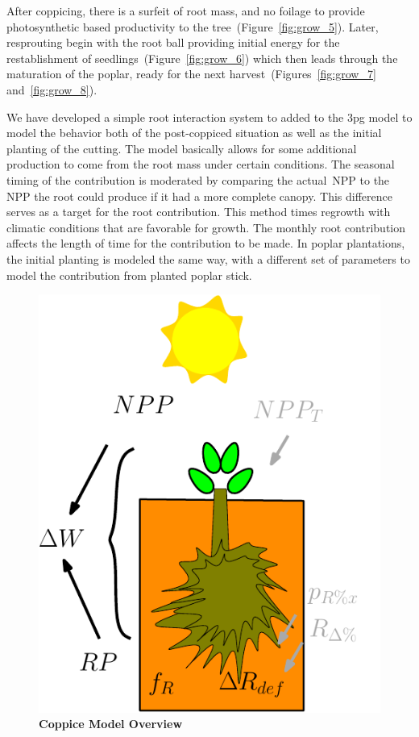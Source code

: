\documentclass[10pt]{article}
\begin{document}
After coppicing, there is a surfeit of root mass, and no foilage to
provide photosynthetic based productivity to the
tree~(Figure~\ref{fig:grow_5}).  Later, resprouting begin with the
root ball providing initial energy for the restablishment of
seedlings~(Figure~\ref{fig:grow_6}) which then leads through the
maturation of the poplar, ready for the next
harvest~(Figures~\ref{fig:grow_7} and~\ref{fig:grow_8}).

We have developed a simple root interaction system to added to the
\ac{3pg} model to model the behavior both of the post-coppiced
situation as well as the initial planting of the cutting.  The model
basically allows for some additional production to come from the root
mass under certain conditions.  The seasonal timing of the
contribution is moderated by comparing the actual~\ac{NPP} to the
\ac{NPP} the root could produce if it had a more complete canopy.
This difference serves as a target for the root contribution.  This
method times regrowth with climatic conditions that are favorable for
growth.  The monthly root contribution affects the length of time for
the contribution to be made.  In poplar plantations, the initial
planting is modeled the same way, with a different set of parameters
to model the contribution from planted poplar stick.


\begin{figure}[!ht]
  \centering
  \includegraphics{img/tree_pics_10}
  \caption{\textbf{Coppice Model Overview}}
  \label{fig:coppice}
\end{figure}
\end{document}
